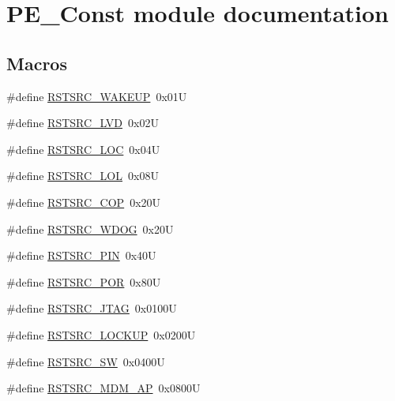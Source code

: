 \hypertarget{group___p_e___const__module}{}\section{P\+E\+\_\+\+Const module documentation}
\label{group___p_e___const__module}
\subsection*{Macros}
\begin{DoxyCompactItemize}
\item 
\#define \hyperlink{group___p_e___const__module_gaeed5dacbb9d0e07213c8840434f6cd6a}{R\+S\+T\+S\+R\+C\+\_\+\+W\+A\+K\+E\+U\+P}~0x01\+U
\item 
\#define \hyperlink{group___p_e___const__module_gae1c2803b0eda52457ab29cb138988581}{R\+S\+T\+S\+R\+C\+\_\+\+L\+V\+D}~0x02\+U
\item 
\#define \hyperlink{group___p_e___const__module_gabb1e7755f19390476da47c14af3c0a7d}{R\+S\+T\+S\+R\+C\+\_\+\+L\+O\+C}~0x04\+U
\item 
\#define \hyperlink{group___p_e___const__module_ga653fd4a8b1b389c8ee4f906182ac1638}{R\+S\+T\+S\+R\+C\+\_\+\+L\+O\+L}~0x08\+U
\item 
\#define \hyperlink{group___p_e___const__module_ga140be6eb76fc072ee4176e965b87b244}{R\+S\+T\+S\+R\+C\+\_\+\+C\+O\+P}~0x20\+U
\item 
\#define \hyperlink{group___p_e___const__module_ga789b8aee910293e98e3d259ced79864c}{R\+S\+T\+S\+R\+C\+\_\+\+W\+D\+O\+G}~0x20\+U
\item 
\#define \hyperlink{group___p_e___const__module_gabdcb9366c44b44d35909bdbf2fcf3d9d}{R\+S\+T\+S\+R\+C\+\_\+\+P\+I\+N}~0x40\+U
\item 
\#define \hyperlink{group___p_e___const__module_ga3511c871d0a516c574a91e1bac210238}{R\+S\+T\+S\+R\+C\+\_\+\+P\+O\+R}~0x80\+U
\item 
\#define \hyperlink{group___p_e___const__module_ga00a839ede0e69be1bc641f907de8b5f8}{R\+S\+T\+S\+R\+C\+\_\+\+J\+T\+A\+G}~0x0100\+U
\item 
\#define \hyperlink{group___p_e___const__module_ga46168abf3bfc8b58479ecace7641559b}{R\+S\+T\+S\+R\+C\+\_\+\+L\+O\+C\+K\+U\+P}~0x0200\+U
\item 
\#define \hyperlink{group___p_e___const__module_ga3c4274430f181cdab8c0c705df651784}{R\+S\+T\+S\+R\+C\+\_\+\+S\+W}~0x0400\+U
\item 
\#define \hyperlink{group___p_e___const__module_ga18886b7d76fe2b7babb3c16428f6af06}{R\+S\+T\+S\+R\+C\+\_\+\+M\+D\+M\+\_\+\+A\+P}~0x0800\+U

\end{DoxyCompactItemize}

